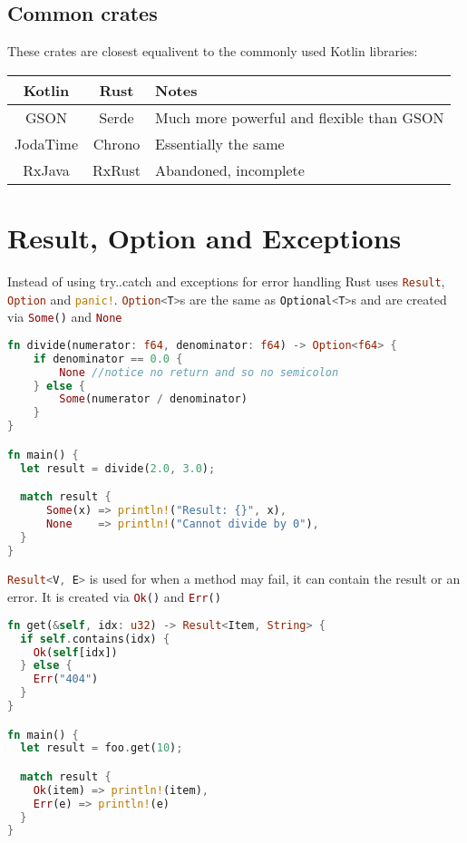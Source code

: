 \documentclass[a4paper,11pt]{article}
\begin{document}
\subsection{Common crates}
These crates are closest equalivent to the commonly used Kotlin libraries:
\begin{center}
\begin{tabular}{ c|c|l } 
 Kotlin & Rust & Notes \\ 
 \hline
 GSON & Serde & Much more powerful and flexible than GSON \\
 JodaTime & Chrono & Essentially the same \\
 RxJava & RxRust & Abandoned, incomplete \\
\end{tabular}
\end{center}

\renewcommand{\arraystretch}{1}

\newpage
\section{Result, Option and Exceptions}
Instead of using try..catch and exceptions for error handling Rust uses \lstinline[language=Rust]{Result}, \lstinline[language=Rust]{Option} and \lstinline[language=Rust]{panic!}.
\newline
\newline
\lstinline[language=Rust]{Option<T>}s are the same as \lstinline[language=Kotlin]{Optional<T>}s and are created via \lstinline[language=Rust]{Some()} and \lstinline[language=Rust]{None}
\begin{lstlisting}[language=Rust,frame=single]
fn divide(numerator: f64, denominator: f64) -> Option<f64> {
    if denominator == 0.0 {
        None //notice no return and so no semicolon
    } else {
        Some(numerator / denominator)
    }
}

fn main() {
  let result = divide(2.0, 3.0);

  match result {
      Some(x) => println!("Result: {}", x),
      None    => println!("Cannot divide by 0"),
  }
}
\end{lstlisting}

\lstinline[language=Rust]{Result<V, E>} is used for when a method may fail, it can contain the result or an error. It is created via \lstinline[language=Rust]{Ok()} and \lstinline[language=Rust]{Err()}

\begin{lstlisting}[language=Rust,frame=single]
fn get(&self, idx: u32) -> Result<Item, String> {
  if self.contains(idx) {
    Ok(self[idx])
  } else {
    Err("404")
  }
}

fn main() {
  let result = foo.get(10);

  match result {
    Ok(item) => println!(item),
    Err(e) => println!(e)
  }
}
\end{lstlisting}
\end{document}
